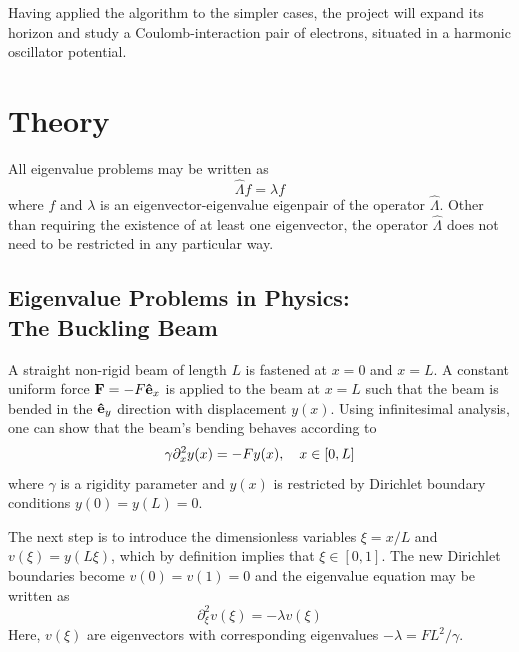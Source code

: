 \documentclass[reprint,english]{revtex4-1}
\begin{document}
Having applied the algorithm to the simpler cases, the project will expand its horizon and study a Coulomb-interaction pair of electrons, situated in a harmonic oscillator potential.
\section{Theory}
All eigenvalue problems may be written as
\begin{equation}
\hat{\Lambda}f=\lambda f
\end{equation}
where \(f\) and \(\lambda\) is an eigenvector-eigenvalue eigenpair of the operator \(\hat{\Lambda}\). Other than requiring the existence of at least one eigenvector, the operator \(\hat{\Lambda}\) does not need to be restricted in any particular way.
\subsection{Eigenvalue Problems in Physics:\\The Buckling Beam}
A straight non-rigid beam of length \(L\) is fastened at \(x=0\) and \(x=L\). A constant uniform force \(\vb{F}=-F\vu{e}_x\) is applied to the beam at \(x=L\) such that the beam is bended in the \(\vu{e}_y\) direction with displacement \(y(x)\). Using infinitesimal analysis, one can show that the beam's bending behaves according to
\begin{equation}\label{eq:initial_buckling_beam}
\gamma\partial_x^2y(x)=-Fy(x)\qc x\in[0,L]
\end{equation}
where \(\gamma\) is a rigidity parameter and \(y(x)\) is restricted by Dirichlet boundary conditions \(y(0)=y(L)=0\).

The next step is to introduce the dimensionless variables \(\xi=x/L\) and \(v(\xi)=y(L\xi)\), which by definition implies that \(\xi\in[0,1]\). The new Dirichlet boundaries become \(v(0)=v(1)=0\) and the eigenvalue equation may be written as
\begin{equation}\label{eq:dimless_buckling_beam}
\partial_{\xi}^2v(\xi)=-\lambda v(\xi)
\end{equation}
Here, \(v(\xi)\) are eigenvectors with corresponding eigenvalues \(-\lambda=FL^2/\gamma\).
\end{document}
